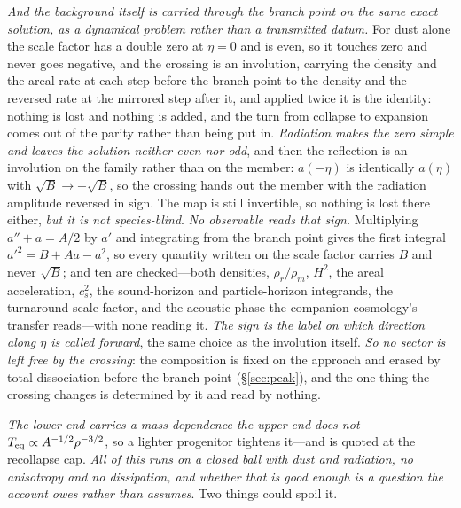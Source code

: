 \documentclass[11pt,a4paper]{article}
\theoremstyle{plain}
\theoremstyle{definition}
\theoremstyle{remark}
\begin{document}
\emph{And the background itself is carried through the branch point on the same exact solution, as a dynamical problem rather than a transmitted datum.} For dust alone the scale factor has a double zero at $\eta=0$ and is even, so it touches zero and never goes negative, and the crossing is an involution, carrying the density and the areal rate at each step before the branch point to the density and the reversed rate at the mirrored step after it, and applied twice it is the identity: nothing is lost and nothing is added, and the turn from collapse to expansion comes out of the parity rather than being put in. \emph{Radiation makes the zero simple and leaves the solution neither even nor odd}, and then the reflection is an involution on the family rather than on the member: $a(-\eta)$ is identically $a(\eta)$ with $\sqrt B\to-\sqrt B$, so the crossing hands out the member with the radiation amplitude reversed in sign. The map is still invertible, so nothing is lost there either, \emph{but it is not species-blind}. \emph{No observable reads that sign.} Multiplying $a''+a=A/2$ by $a'$ and integrating from the branch point gives the first integral $a'^{2}=B+Aa-a^{2}$, so every quantity written on the scale factor carries $B$ and never $\sqrt B$; and ten are checked---both densities, $\rho_r/\rho_m$, $H^{2}$, the areal acceleration, $c_s^{2}$, the sound-horizon and particle-horizon integrands, the turnaround scale factor, and the acoustic phase the companion cosmology's transfer reads---with none reading it. \emph{The sign is the label on which direction along $\eta$ is called forward}, the same choice as the involution itself. \emph{So no sector is left free by the crossing}: the composition is fixed on the approach and erased by total dissociation before the branch point (\S\ref{sec:peak}), and the one thing the crossing changes is determined by it and read by nothing.

\emph{The lower end carries a mass dependence the upper end does not}---$T_{\rm eq}\propto A^{-1/2}\rho^{-3/2}$, so a lighter progenitor tightens it---and is quoted at the recollapse cap. \emph{All of this runs on a closed ball with dust and radiation, no anisotropy and no dissipation, and whether that is good enough is a question the account owes rather than assumes}. Two things could spoil it. 
\end{document}
